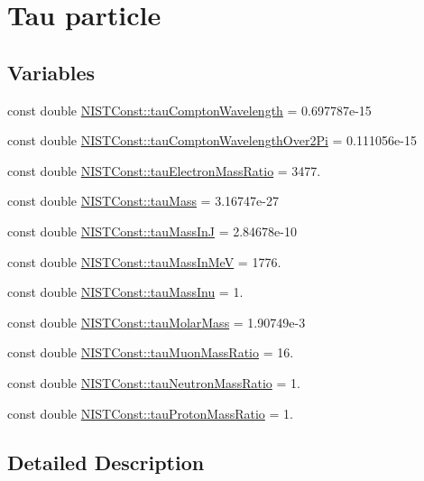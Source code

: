 \hypertarget{group___tau}{}\section{Tau particle}
\label{group___tau}
\subsection*{Variables}
\begin{DoxyCompactItemize}
\item 
const double \hyperlink{group___tau_ga02608ef1c26b9550ee7547350bbcdd5d}{N\+I\+S\+T\+Const\+::tau\+Compton\+Wavelength} = 0.\+697787e-\/15
\item 
const double \hyperlink{group___tau_ga3cca663c9ba88e04346cbd29643aba14}{N\+I\+S\+T\+Const\+::tau\+Compton\+Wavelength\+Over2\+Pi} = 0.\+111056e-\/15
\item 
const double \hyperlink{group___tau_ga58efae35c13c681c03e115a97659063a}{N\+I\+S\+T\+Const\+::tau\+Electron\+Mass\+Ratio} = 3477.
\item 
const double \hyperlink{group___tau_gabb1b68dd381ed2582050fd991f210be8}{N\+I\+S\+T\+Const\+::tau\+Mass} = 3.\+16747e-\/27
\item 
const double \hyperlink{group___tau_ga16b85e377d419016e21dc80e464d811c}{N\+I\+S\+T\+Const\+::tau\+Mass\+InJ} = 2.\+84678e-\/10
\item 
const double \hyperlink{group___tau_ga9959b7d66d60226941c2d2658606a4e2}{N\+I\+S\+T\+Const\+::tau\+Mass\+In\+MeV} = 1776.
\item 
const double \hyperlink{group___tau_gaa0a5019135251853d2761cb9af892aea}{N\+I\+S\+T\+Const\+::tau\+Mass\+Inu} = 1.
\item 
const double \hyperlink{group___tau_ga07e317845454c4534cc0273efa2e55c6}{N\+I\+S\+T\+Const\+::tau\+Molar\+Mass} = 1.\+90749e-\/3
\item 
const double \hyperlink{group___tau_gac648100c94ae427f98a87390a9263379}{N\+I\+S\+T\+Const\+::tau\+Muon\+Mass\+Ratio} = 16.
\item 
const double \hyperlink{group___tau_ga024557c365e76b225bef98f0a0a9283b}{N\+I\+S\+T\+Const\+::tau\+Neutron\+Mass\+Ratio} = 1.
\item 
const double \hyperlink{group___tau_ga07236b2b11bdbfaee49e581a44bb01e8}{N\+I\+S\+T\+Const\+::tau\+Proton\+Mass\+Ratio} = 1.
\end{DoxyCompactItemize}


\subsection{Detailed Description}


